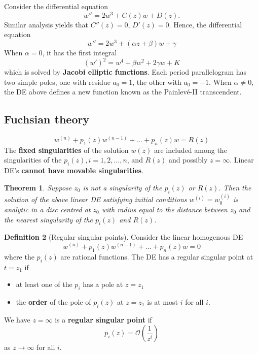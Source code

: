 \documentclass[10pt, oneside, reqno]{amsart}
\theoremstyle{plain}%
\newtheorem{thm}{Theorem}[section]
\theoremstyle{definition}
\newtheorem{defn}[thm]{Definition}
\theoremstyle{remark}
\newcommand{\bigo}[1]{\mathcal{O}(#1)}
\begin{document}
Consider the differential equation \[
    w'' = 2w^3 + C(z) w + D(z).
\]
Similar analysis yields that $C''(z) = 0$, $D'(z) = 0$.  Hence, the differential equation \[
    w'' = 2w^3 + (\alpha z + \beta)w + \gamma
\]  When $\alpha = 0$, it has the first integral \[
    (w')^2 = w^4 + \beta w^2 + 2 \gamma w + K
\] which is solved by \textbf{Jacobi elliptic functions}.  Each period parallelogram has two simple poles, one with residue $a_0 = 1$, the other with $a_0 =  -1$.  When $\alpha \neq 0$, the DE above defines a new function known as the Painlev\'e-II transcendent.








\subsection{Fuchsian theory} %
\label{sec:fuchsian_theory}
\[
    w^{(n)} + p_1(z) w^{(n-1)} + \dots + p_n(z) w = R(z)
\]
The \textbf{fixed singularities} of the solution $w(z)$ are included among the singularities of the $p_i(z), i = 1, 2, \dots, n$, and $R(z)$ and possibly $z = \infty$.  Linear DE's \textbf{cannot have movable singularities}.

\begin{thm}
    Suppose $z_0$ is not a singularity of the $p_i(z)$ or $R(z)$.  Then the solution of the above linear DE satisfying initial conditions $w^(i) = w^(i)_0$ is analytic in a disc centred at $z_0$ with radius equal to the distance between $z_0$ and the nearest singularity of the $p_i(z)$ and $R(z)$. 
\end{thm}

\begin{defn}[Regular singular points]
    Consider the linear homogenous DE \[
        w^{(n)} + p_1(z) w^{(n-1)} + \dots + p_n(z) w = 0
    \] where the $p_i(z)$ are rational functions.  The DE has a regular singular point at $t = z_1$ if 
    \begin{itemize}
        \item at least one of the $p_i$ has a pole at $z = z_1$
        \item the \textbf{order} of the pole of $p_i(z)$ at $z = z_1$ is at most $i$ for all $i$.
    \end{itemize}
    We have $z = \infty$ is a \textbf{regular singular point} if \[
        p_i(z) = \bigo{\frac{1}{z^i}}
    \]  as $z \rightarrow \infty$ for all $i$.
\end{defn}
\end{document}
